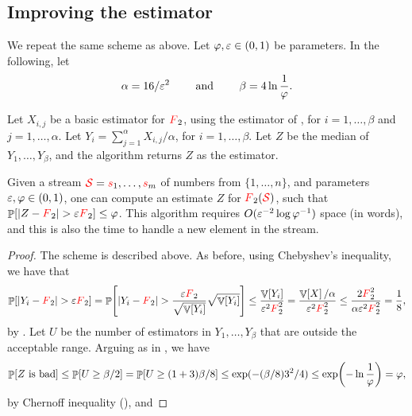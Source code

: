
\subsection{Improving the estimator}

We repeat the same scheme as above.  Let $\varphi, {\varepsilon} \in (0,1)$ be
parameters.  In the following, let
\begin{equation*}
    \alpha = 16 / \eps^2%
    \qquad\text{ and }\qquad%
    \beta = 4 \ln \frac{1}{\BadProb}.%
\end{equation*}

Let $X_{i,j}$ be a basic estimator for ${\textcolor{red}{F}}_2$, using the estimator
of , for $i=1,\ldots, \beta$ and
$j=1, \ldots, \alpha$.  Let
$Y_i = \sum_{j=1}^{\alpha} X_{i,j} / \alpha$, for
$i=1, \ldots, \beta$. Let $Z$ be the median of $Y_1, \ldots, Y_\beta$,
and the algorithm returns $Z$ as the estimator.



\begin{theorem}
    Given a stream ${\textcolor{red}{\mathcal{S}}} = {\textcolor{red}{{s}}}_1, \ldots, {\textcolor{red}{{s}}}_m$ of numbers from
    $\{1,\ldots, n\}$, and parameters ${\varepsilon}, \varphi \in (0,1)$, one
    can compute an estimate $Z$ for ${\textcolor{red}{F}}_2({\textcolor{red}{\mathcal{S}}})$, such that
    $\Prob{ |Z - \Frq_2| > \eps \Frq_2} \leq \BadProb$. This algorithm
    requires $O( {\varepsilon}^{-2} \log \varphi^{-1})$ space (in words), and
    this is also the time to handle a new element in the stream.
\end{theorem}
\begin{proof}
    The scheme is described above. As before, using Chebyshev's
    inequality, we have that
    \begin{equation*}
        \Prob{ \cardin{Y_i - \Frq_2} > \eps \Frq_2 }%
        =%
        \Prob{ \cardin{Y_i - \Frq_2} >
           \frac{\eps \Frq_2}{ \sqrt{\Var{Y_i}}} \sqrt{\Var{Y_i}}}%
        \leq%
        \frac{\Var{Y_i}}{\eps^2 \Frq_2^2}%
        =%
        \frac{\Var{X} / \alpha}{\eps^2 \Frq_2^2}%
        \leq %
        \frac{2 \Frq_2^2}{\alpha \eps^2 \Frq_2^2}%
        =%
        \frac{1}{8},
    \end{equation*}
    by . Let $U$ be the number of estimators in
    $Y_1, \ldots, Y_\beta$ that are outside the acceptable range.
    Arguing as in , we have
    \begin{equation*}
        \Prob{Z \text{ is bad}}%
        \leq%
        \Prob{U \geq \beta/2} %
        = %
        \Prob{U \geq (1+ 3)\beta/8}%
        \leq%
        \exp( - (\beta/8) 3^2/4 )%
        \leq%
        \exp\pth{ - \ln \frac{1}{\BadProb}}
        =%
        \BadProb,
    \end{equation*}
    by Chernoff inequality (), and
\end{proof}

